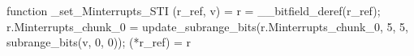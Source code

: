 function _set_Minterrupts_STI (r_ref, v) = {
    r = __bitfield_deref(r_ref);
    r.Minterrupts_chunk_0 = update_subrange_bits(r.Minterrupts_chunk_0, 5, 5, subrange_bits(v, 0, 0));
    (*r_ref) = r
}

